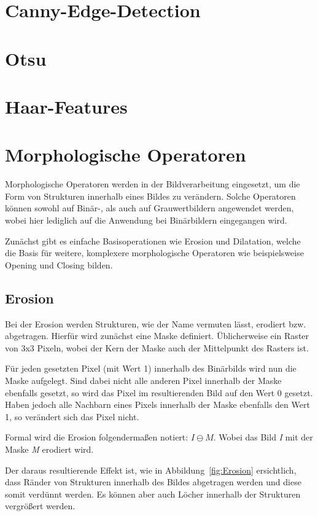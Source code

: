 \section{Canny-Edge-Detection} %
\section{Otsu} %
\section{Haar-Features} %

\section{Morphologische Operatoren} %
Morphologische Operatoren werden in der Bildverarbeitung eingesetzt, um die Form von Strukturen innerhalb eines Bildes zu verändern.
Solche Operatoren können sowohl auf Binär-, als auch auf Grauwertbildern angewendet werden, wobei hier lediglich auf die Anwendung bei Binärbildern
eingegangen wird.

Zunächst gibt es einfache Basisoperationen wie Erosion und Dilatation, welche die Basis für weitere, komplexere morphologische Operatoren wie beispielsweise Opening und Closing bilden.

\subsection{Erosion}
Bei der Erosion werden Strukturen, wie der Name vermuten lässt, erodiert bzw. abgetragen.
Hierfür wird zunächst eine Maske definiert. Üblicherweise ein Raster von 3x3 Pixeln, wobei der Kern der Maske auch der Mittelpunkt des Rasters ist.

Für jeden gesetzten Pixel (mit Wert 1) innerhalb des Binärbilds wird nun die Maske aufgelegt. Sind dabei nicht alle anderen Pixel innerhalb der Maske ebenfalls gesetzt, so wird das Pixel im resultierenden Bild auf den Wert 0 gesetzt.
Haben jedoch alle Nachbarn eines Pixels innerhalb der Maske ebenfalls den Wert 1, so verändert sich das Pixel nicht.

Formal wird die Erosion folgendermaßen notiert: $ I \ominus M $. Wobei das Bild {\em I} mit der Maske {\em M} erodiert wird.

Der daraus resultierende Effekt ist, wie in Abbildung~\ref{fig:Erosion} ersichtlich, dass Ränder von Strukturen innerhalb des Bildes abgetragen werden und diese somit verdünnt werden. Es können aber auch Löcher innerhalb der Strukturen vergrößert werden.


